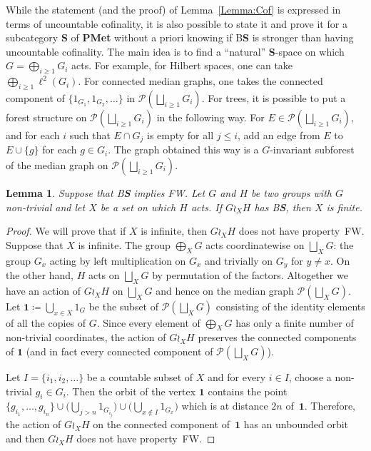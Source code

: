 \documentclass[a4paper]{article}
\newtheorem{lem}{Lemma}[section]
\theoremstyle{definition}
\newcommand*{\category}[1]{\textbf{#1}}
\newcommand*{\PMet}{\category{PMet}}
\newcommand*{\CatS}{\category{S}}
\newcommand*{\BS}{B\textbf{S}}
\newcommand*{\FW}{FW}
\newcommand*{\powerset}[1]{\mathcal P(#1)}
\begin{document}
While the statement (and the proof) of Lemma~\ref{Lemma:Cof} is expressed in terms of uncountable cofinality, it is also possible to state it and prove it for a subcategory \CatS{} of \PMet{} without a priori knowing if \BS{} is stronger than having uncountable cofinality.
The main idea is to find a ``natural'' \CatS-space on which $G=\bigoplus_{i\geq 1}G_i$ acts. For example, for Hilbert spaces, one can take $\bigoplus_{i\geq 1}\ell^2(G_i)$. For connected median graphs, one takes the connected component of $\{1_{G_1},1_{G_2},\dots\}$ in $\powerset{\bigsqcup_{i\geq 1} G_i}$.
For trees, it is possible to put a forest structure on $\powerset{\bigsqcup_{i\geq 1} G_i}$ in the following way.
For $E\in\powerset{\bigsqcup_{i\geq 1} G_i}$, and for each $i$ such that $E\cap G_j$ is empty for all $j\leq i$, add an edge from $E$ to $E\cup\{g\}$ for each $g\in G_i$. The graph obtained this way is a $G$-invariant subforest of the median graph on $\powerset{\bigsqcup_{i\geq 1} G_i}$.
%
%
\begin{lem}\label{Lemma:XFinite}
Suppose that \BS{} implies \FW.
Let $G$ and $H$ be two groups with $G$ non-trivial and let $X$ be a set on which $H$ acts.
If $G\wr_XH$ has \BS, then $X$ is finite.
\end{lem}
\begin{proof}
We will prove that if $X$ is infinite, then $G\wr_XH$ does not have property~\FW. Suppose that $X$ is infinite.
The group $\bigoplus_XG$ acts coordinatewise on  $\bigsqcup_XG$: the group $G_x$ acting by left multiplication on $G_x$ and trivially on $G_y$ for $y\neq x$. On the other hand, $H$ acts on $\bigsqcup_XG$ by permutation of the factors.
Altogether we have an action of $G\wr_XH$ on $\bigsqcup_XG$ and hence on the median graph $\powerset{\bigsqcup_XG}$.
Let $\mathbf 1\coloneqq\bigcup_{x\in X} 1_{G}$ be the subset of $\powerset{\bigsqcup_XG}$ consisting of the identity elements of all the copies of $G$.
Since every element of $\bigoplus_XG$ has only a finite number of non-trivial coordinates, the action of $G\wr_XH$ preserves the connected components of $\mathbf 1$ (and in fact every connected component of $\powerset{\bigsqcup_XG}$).

Let $I=\{i_1,i_2,\dots\}$ be a countable subset of $X$ and for every $i\in I$, choose a non-trivial $g_i\in G_{i}$.
Then the orbit of the vertex $\mathbf 1$ contains the point $\{g_{i_1},\dots, g_{i_n}\}\cup\bigl(\bigcup_{j>n} 1_{G_{i_j}}\bigr)\cup\bigl(\bigcup_{x\notin I} 1_{G_{x}}\bigr)$ which is at distance $2n$ of~$\mathbf 1$.
Therefore, the action of $G\wr_XH$ on the connected component of~$\mathbf 1$ has an unbounded orbit and then $G\wr_XH$ does not have property~\FW.
\end{proof}
\end{document}
